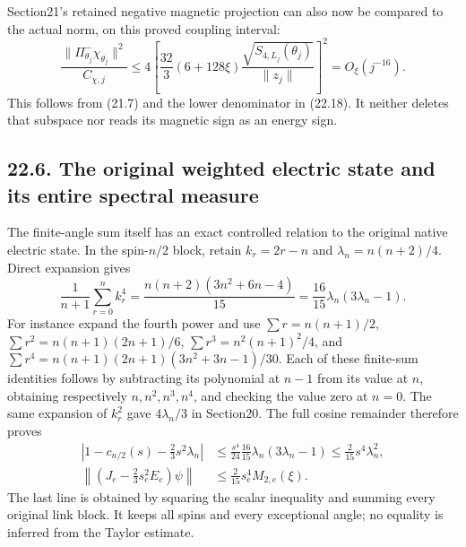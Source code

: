 \documentclass[
]{article}
\begin{document}
Section21's retained negative magnetic projection can also now be
compared to the actual norm, on this proved coupling interval: \[
\frac{\|\Pi_{\theta_j}^-\chi_{\theta_j}\|^2}{C_{\chi,j}}
\le
4\left[
\frac{32}{3}(6+128\xi)
\frac{\sqrt{S_{4,L_j}(\theta_j)}}{\|z_j\|}
\right]^2
 =O_\xi(j^{-16}).                                             \tag{22.21}
\] This follows from (21.7) and the lower denominator in (22.18). It
neither deletes that subspace nor reads its magnetic sign as an energy
sign.

\subsection{22.6. The original weighted electric state and its entire
spectral
measure}\label{the-original-weighted-electric-state-and-its-entire-spectral-measure}

The finite-angle sum itself has an exact controlled relation to the
original native electric state. In the spin-\(n/2\) block, retain
\(k_r=2r-n\) and \(\lambda_n=n(n+2)/4\). Direct expansion gives \[
\frac1{n+1}\sum_{r=0}^n k_r^4
 =\frac{n(n+2)(3n^2+6n-4)}{15}
 =\frac{16}{15}\lambda_n(3\lambda_n-1).
\] For instance expand the fourth power and use \(\sum r=n(n+1)/2\),
\(\sum r^2=n(n+1)(2n+1)/6\), \(\sum r^3=n^2(n+1)^2/4\), and
\(\sum r^4=n(n+1)(2n+1)(3n^2+3n-1)/30\). Each of these finite-sum
identities follows by subtracting its polynomial at \(n-1\) from its
value at \(n\), obtaining respectively \(n,n^2,n^3,n^4\), and checking
the value zero at \(n=0\). The same expansion of \(k_r^2\) gave
\(4\lambda_n/3\) in Section20. The full cosine remainder therefore
proves \[
\begin{aligned}
\left|1-c_{n/2}(s)-\frac23s^2\lambda_n\right|
 &\le\frac{s^4}{24}\frac{16}{15}\lambda_n(3\lambda_n-1)
 \le\frac{2}{15}s^4\lambda_n^2,\\
\left\|\left(J_e-\frac23s_e^2E_e\right)\psi\right\|
 &\le\frac{2}{15}s_e^4 M_{2,e}(\xi).
\end{aligned}                                                   \tag{22.22}
\] The last line is obtained by squaring the scalar inequality and
summing every original link block. It keeps all spins and every
exceptional angle; no equality is inferred from the Taylor estimate.
\end{document}
